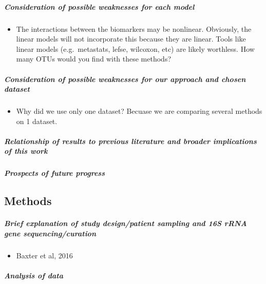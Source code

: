 \documentclass[11pt,]{article}
\providecommand{\tightlist}{%
  \setlength{\itemsep}{0pt}\setlength{\parskip}{0pt}}
\let\oldsubparagraph\subparagraph
\renewcommand{\subparagraph}[1]{\oldsubparagraph{#1}\mbox{}}
\begin{document}
\subparagraph{Consideration of possible weaknesses for each
model}\label{consideration-of-possible-weaknesses-for-each-model}

\begin{itemize}
\tightlist
\item
  The interactions between the biomarkers may be nonlinear. Obviously,
  the linear models will not incorporate this because they are linear.
  Tools like linear models (e.g.~metastats, lefse, wilcoxon, etc) are
  likely worthless. How many OTUs would you find with these methods?
\end{itemize}

\subparagraph{Consideration of possible weaknesses for our approach and
chosen
dataset}\label{consideration-of-possible-weaknesses-for-our-approach-and-chosen-dataset}

\begin{itemize}
\tightlist
\item
  Why did we use only one dataset? Becuase we are comparing several
  methods on 1 dataset.
\end{itemize}

\subparagraph{Relationship of results to previous literature and broader
implications of this
work}\label{relationship-of-results-to-previous-literature-and-broader-implications-of-this-work}

\subparagraph{Prospects of future
progress}\label{prospects-of-future-progress}

\subsection{Methods}\label{methods}

\subparagraph{Brief explanation of study design/patient sampling and 16S
rRNA gene
sequencing/curation}\label{brief-explanation-of-study-designpatient-sampling-and-16s-rrna-gene-sequencingcuration}

\begin{itemize}
\tightlist
\item
  Baxter et al, 2016
\end{itemize}

\subparagraph{Analysis of data}\label{analysis-of-data}
\end{document}
